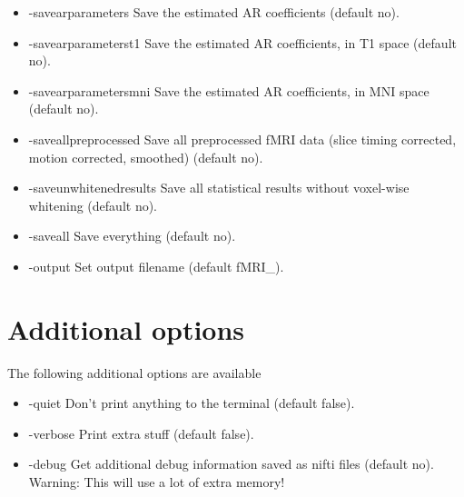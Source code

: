 \begin{itemize}
\item -savearparameters          
\newline \newline Save the estimated AR coefficients (default no). 

\item -savearparameterst1        
\newline \newline Save the estimated AR coefficients, in T1 space (default no). 

\item -savearparametersmni       
\newline \newline Save the estimated AR coefficients, in MNI space (default no). 

\item -saveallpreprocessed       
\newline \newline Save all preprocessed fMRI data  \newline (slice timing corrected, motion corrected, smoothed) (default no). 

\item -saveunwhitenedresults     
\newline \newline Save all statistical results without voxel-wise whitening (default no). 

\item -saveall                   
\newline \newline Save everything (default no). 

\item -output 
\newline \newline Set output filename (default fMRI\_).

\end{itemize}

\section{Additional options}

The following additional options are available

\begin{itemize}

\item -quiet
\newline \newline Don't print anything to the terminal (default false). 

\item -verbose
\newline \newline Print extra stuff (default false).

\item -debug
\newline \newline Get additional debug information saved as nifti files (default no). Warning: This will use a lot of extra memory! 

\end{itemize}

